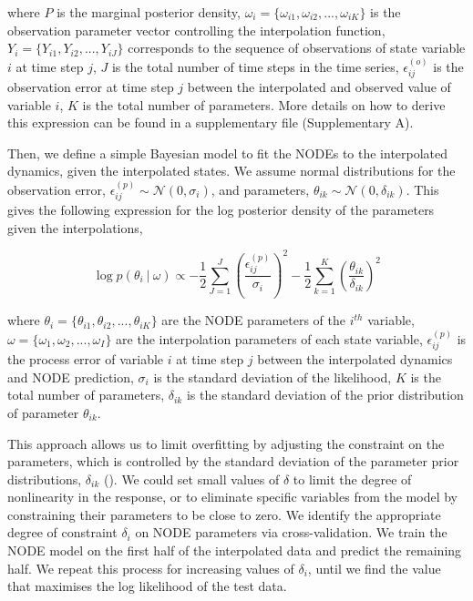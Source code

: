 \documentclass[11pt, oneside]{article}
\begin{document}
where $P$ is the marginal posterior density,
$\omega_i = \{\omega_{i1},\omega_{i2},...,\omega_{iK}\}$ is the observation parameter vector controlling the interpolation function,
$Y_i = \{Y_{i1},Y_{i2},...,Y_{iJ}\}$ corresponds to the sequence of observations of state variable $i$ at time step $j$, 
$J$ is the total number of time steps in the time series, 
$\epsilon^{(o)}_{ij}$ is the observation error at time step $j$ between the interpolated and observed  value of variable $i$, 
$K$ is the total number of parameters. 
More details on how to derive this expression can be found in a supplementary file (Supplementary A).

Then, we define a simple Bayesian model to fit the NODEs to the interpolated dynamics, given the interpolated states.
We assume normal distributions for the observation error, $\epsilon^{(p)}_{ij} \sim \mathcal{N}(0,\sigma_i)$, and parameters, $\theta_{ik} \sim \mathcal{N}(0,\delta_{ik})$.
This gives the following expression for the log posterior density of the parameters given the interpolations,

\vspace{-0.5cm}
\begin{equation}
    \log p(\theta_i ~|~ \omega) \propto - \frac{1}{2} \sum_{J=1}^{J} \left( \frac{\epsilon^{(p)}_{ij}}{\sigma_i} \right)^2 - \frac{1}{2} \sum_{k=1}^{K} \left( \frac{\theta_{ik}}{\delta_{ik}} \right)^2
\end{equation}

where $\theta_i = \{\theta_{i1},\theta_{i2},...,\theta_{iK}\}$ are the NODE parameters of the $i^{th}$ variable,
$\omega = \{\omega_1,\omega_2,...,\omega_I\}$ are the interpolation parameters of each state variable, 
$\epsilon^{(p)}_{ij}$ is the process error of variable $i$ at time step $j$ between the interpolated dynamics and NODE prediction, 
$\sigma_i$ is the standard deviation of the likelihood, 
$K$ is the total number of parameters, 
$\delta_{ik}$ is the standard deviation of the prior distribution of parameter $\theta_{ik}$.

This approach allows us to limit overfitting by adjusting the constraint on the parameters, which is controlled by the standard deviation of the parameter prior distributions, $\delta_{ik}$ (\cite{Cawley2007, Bonnaffe2021a}).
We could set small values of $\delta$ to limit the degree of nonlinearity in the response, or to eliminate specific variables from the model by constraining their parameters to be close to zero.
We identify the appropriate degree of constraint $\delta_{i}$ on NODE parameters via cross-validation. 
We train the NODE model on the first half of the interpolated data and predict the remaining half.
We repeat this process for increasing values of $\delta_{i}$, until we find the value that maximises the log likelihood of the test data.
\end{document}
